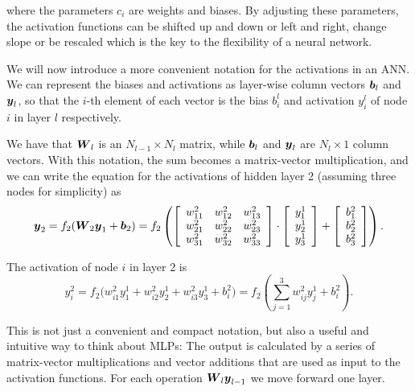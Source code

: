 where the parameters $c_i$ are weights and biases. By adjusting these
parameters, the activation functions can be shifted up and down or
left and right, change slope or be rescaled which is the key to the
flexibility of a neural network.

We will now introduce a more convenient notation for the activations in an ANN. 
We can represent the biases and activations
as layer-wise column vectors ${\boldsymbol{b}}_l$ and ${\boldsymbol{y}}_l$, so that the $i$-th element of each vector 
is the bias $b_i^l$ and activation $y_i^l$ of node $i$ in layer $l$ respectively. 

We have that ${\boldsymbol{W}}_l$ is an $N_{l-1} \times N_l$ matrix, 
while ${\boldsymbol{b}}_l$ and ${\boldsymbol{y}}_l$ are $N_l \times 1$ column vectors. 
With this notation, the sum becomes a matrix-vector multiplication, and we can write
the equation for the activations of hidden layer 2 (assuming three nodes for simplicity) as
\begin{equation}
 {\boldsymbol{y}}_2 = f_2({\boldsymbol{W}}_2 {\boldsymbol{y}}_{1} + {\boldsymbol{b}}_{2}) = 
 f_2\left(\left[\begin{array}{ccc}
    w^2_{11} &w^2_{12} &w^2_{13} \\
    w^2_{21} &w^2_{22} &w^2_{23} \\
    w^2_{31} &w^2_{32} &w^2_{33} \\
    \end{array} \right] \cdot
    \left[\begin{array}{c}
           y^1_1 \\
           y^1_2 \\
           y^1_3 \\
          \end{array}\right] + 
    \left[\begin{array}{c}
           b^2_1 \\
           b^2_2 \\
           b^2_3 \\
          \end{array}\right]\right).
\end{equation}

The activation of node $i$ in layer 2 is
\begin{equation}
 y^2_i = f_2\Bigr(w^2_{i1}y^1_1 + w^2_{i2}y^1_2 + w^2_{i3}y^1_3 + b^2_i\Bigr) = 
 f_2\left(\sum_{j=1}^3 w^2_{ij} y_j^1 + b^2_i\right).
\end{equation}

This is not just a convenient and compact notation, but also a useful
and intuitive way to think about MLPs: The output is calculated by a
series of matrix-vector multiplications and vector additions that are
used as input to the activation functions. For each operation
${\boldsymbol{W}}_l {\boldsymbol{y}}_{l-1}$ we move forward one layer.

